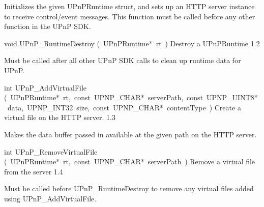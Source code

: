 \documentclass{article}
\begin{document}
\begin{cxxentry}
\begin{cxxfunction}
\begin{cxxdoc}
Initializes the given UPnPRuntime struct, and sets up an HTTP
server instance to receive control/event messages.  This function
must be called before any other function in the UPnP SDK.


\end{cxxdoc}
\end{cxxfunction}
\begin{cxxfunction}
{void}
        {UPnP\_RuntimeDestroy}
        {(\ UPnPRuntime*\ rt\ )}
        {Destroy a UPnPRuntime }
        {1.2}
\begin{cxxdoc}

Must be called after all other UPnP SDK calls to clean up runtime
data for UPnP.


\end{cxxdoc}
\end{cxxfunction}
\begin{cxxfunction}
{int}
        {UPnP\_AddVirtualFile}
        {(\ UPnPRuntime*\ rt,\ const\ UPNP\_CHAR*\ serverPath,\ const\ UPNP\_UINT8*\ data,\ UPNP\_INT32\ size,\ const\ UPNP\_CHAR*\ contentType\ )}
        {Create a virtual file on the HTTP server. }
        {1.3}
\begin{cxxdoc}

Makes the data buffer passed in available at the given path on the
HTTP server.


\end{cxxdoc}
\end{cxxfunction}
\begin{cxxfunction}
{int}
        {UPnP\_RemoveVirtualFile}
        {(\ UPnPRuntime*\ rt,\ const\ UPNP\_CHAR*\ serverPath\ )}
        {Remove a virtual file from the server }
        {1.4}
\begin{cxxdoc}

Must be called before UPnP\_RuntimeDestroy to remove any virtual files
added using UPnP\_AddVirtualFile.



\end{cxxdoc}
\end{cxxfunction}
\end{cxxentry}
\end{document}

